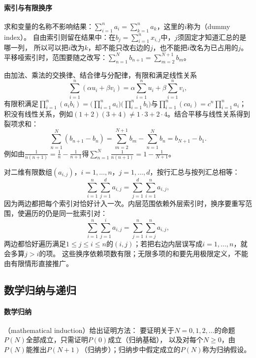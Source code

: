 \paragraph{索引与有限换序}
求和变量的名称不影响结果：$\sum_{i=1}^na_i=\sum_{k=1}^na_k$，这里的$i$称为（dummy index）。
自由索引则留在结果中：在$b_j=\sum_{i=1}^{n}x_{i,j}$中，$j$须固定才知道汇总的是哪一列，
所以可以把$i$改为$k$，却不能只改右边的$j$，也不能把$i$改名为已占用的$j$。
平移哑索引时，范围要随之改写：$\sum_{n=1}^{N}b_{n+1}=\sum_{m=2}^{N+1}b_m$。

由加法、乘法的交换律、结合律与分配律，有限和满足线性关系
\[
 \sum_{i=1}^{n}(\alpha u_i+\beta v_i)=\alpha\sum_{i=1}^{n}u_i+\beta\sum_{i=1}^{n}v_i,
\]
有限积满足$\prod_{i=1}^n(a_ib_i)=\bigl(\prod_{i=1}^na_i\bigr)\bigl(\prod_{i=1}^nb_i\bigr)$与$\prod_{i=1}^n(ca_i)=c^n\prod_{i=1}^na_i$；
积没有线性关系，例如$(1+2)(3+4)\neq1\cdot3+2\cdot4$。结合平移与线性关系得到裂项求和：
\begin{equation}
 \sum_{n=1}^N(b_{n+1}-b_n)=\sum_{m=2}^{N+1}b_m-\sum_{n=1}^{N}b_n=b_{N+1}-b_1.
 \label{eq:prelim-telescoping-sum}
\end{equation}
例如由$\frac1{n(n+1)}=\frac1n-\frac1{n+1}$得$\sum_{n=1}^N\frac1{n(n+1)}=1-\frac1{N+1}$。

对二维有限数组$(a_{i,j})$，$i=1,\ldots,n$，$j=1,\ldots,d$，按行汇总与按列汇总相等：
\[
 \sum_{i=1}^{n}\sum_{j=1}^{d}a_{i,j}=\sum_{j=1}^{d}\sum_{i=1}^{n}a_{i,j},
\]
因为两边都把每个索引对恰好计入一次。内层范围依赖外层索引时，换序要重写范围，使遍历的仍是同一批索引对：
\begin{equation}
 \sum_{i=1}^{n}\sum_{j=1}^{i}a_{i,j}=\sum_{j=1}^{n}\sum_{i=j}^{n}a_{i,j},
 \label{eq:prelim-triangular-sum}
\end{equation}
两边都恰好遍历满足$1\leq j\leq i\leq n$的$(i,j)$；若把右边内层误写成$i=1,\ldots,n$，就会多算$j>i$的项。
这些换序依赖项数有限；无限多项的和要先用极限定义，不能由有限情形直接推广。

\subsection{数学归纳与递归}
\label{sec:prelim-recurrence-unrolling}

\paragraph{数学归纳}
（mathematical induction）给出证明方法：
要证明关于$N=0,1,2,\ldots$的命题$P(N)$全部成立，只需证明$P(0)$成立（归纳基础），
以及对每个$N\geq0$，由$P(N)$能推出$P(N+1)$（归纳步）；归纳步中假定成立的$P(N)$称为归纳假设。

